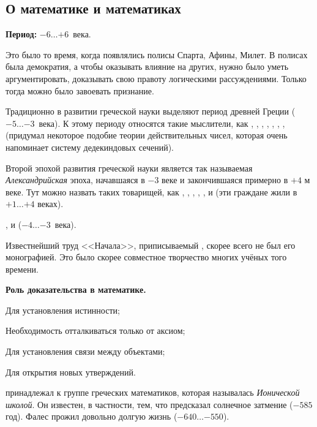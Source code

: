 \documentclass[a4paper,oneside,fleqn,10pt]{article}
\newcommand{\pe}[2]{${#1}\ldots{#2}$}
\begin{document}
\subsection{О математике и математиках}

\textbf{Период:} \pe{-6}{+6}~века.

Это было то время, когда появлялись полисы Спарта, Афины, Милет.  В
полисах была демократия, а чтобы оказывать влияние на других, нужно
было уметь аргументировать, доказывать свою правоту логическими
рассуждениями. Только тогда можно было завоевать признание.

Традиционно в развитии греческой науки выделяют период древней Греции
(\pe{-5}{-3}~века).  К этому периоду относятся такие мыслители, как
, , ,
, , , ,
 (придумал некоторое подобие теории действительных чисел,
которая очень напоминает систему дедекиндовых сечений).

Второй эпохой развития греческой науки является так называемая
\emph{Александрийская} эпоха, начавшаяся в $-3$ веке и закончившаяся
примерно в $+4$ м веке.  Тут можно назвать таких товарищей, как
, , , ,
,  и  (эти граждане жили в \pe{+1}{+4} веках).

,  и 
(\pe{-4}{-3}~века).  

Известнейший труд <<Начала>>, приписываемый ,
скорее всего не был его монографией. Это было скорее совместное
творчество многих учёных того времени.

\textbf{Роль доказательства в математике.}

\begin{items}{-2}
\item Для установления истинности;
\item Необходимость отталкиваться только от аксиом;
\item Для установления связи между объектами;
\item Для открытия новых утверждений.
\end{items}

 принадлежал к группе греческих математиков,
которая называлась \emph{Ионической школой}.  Он известен, в
частности, тем, что предсказал солнечное затмение ($-585$ год). Фалес
прожил довольно долгую жизнь (\pe{-640}{-550}).
\end{document}
